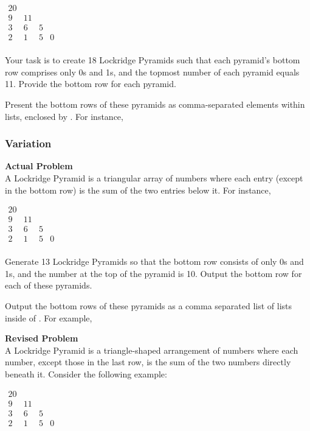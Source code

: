$\begin{array}{cccc}
    20 \\
    9 & 11 \\
    3 &  6 & 5 \\
    2 &  1 & 5 & 0 \\
\end{array}$

Your task is to create 18 Lockridge Pyramids such that each pyramid's bottom row comprises only 0s and 1s, and the topmost number of each pyramid equals 11. Provide the bottom row for each pyramid.

Present the bottom rows of these pyramids as comma-separated elements within lists, enclosed by . For instance, 

\subsubsection{Variation}
\textbf{Actual Problem}\\
A Lockridge Pyramid is a triangular array of numbers where each entry (except in the bottom row) is the sum of the two entries below it. For instance,

$\begin{array}{cccc}
    20 \\
    9 & 11 \\
    3 &  6 & 5 \\
    2 &  1 & 5 & 0 \\
\end{array}$

Generate 13 Lockridge Pyramids so that the bottom row consists of only 0s and 1s, and the number at the top of the pyramid is 10. Output the bottom row for each of these pyramids.

Output the bottom rows of these pyramids as a comma separated list of lists inside of . For example, 

\textbf{Revised Problem}\\
A Lockridge Pyramid is a triangle-shaped arrangement of numbers where each number, except those in the last row, is the sum of the two numbers directly beneath it. Consider the following example:

$\begin{array}{cccc}
    20 \\
    9 & 11 \\
    3 &  6 & 5 \\
    2 &  1 & 5 & 0 \\
\end{array}$

